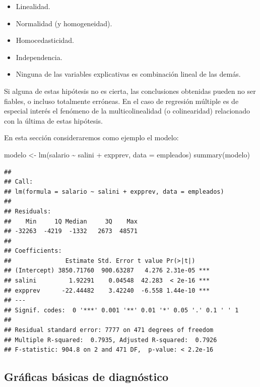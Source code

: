 \documentclass[
]{book}
\newenvironment{Shaded}{\begin{snugshade}}{\end{snugshade}}
\newcommand{\AttributeTok}[1]{\textcolor[rgb]{0.77,0.63,0.00}{#1}}
\newcommand{\FunctionTok}[1]{\textcolor[rgb]{0.00,0.00,0.00}{#1}}
\newcommand{\NormalTok}[1]{#1}
\newcommand{\OtherTok}[1]{\textcolor[rgb]{0.56,0.35,0.01}{#1}}
\newcommand{\SpecialCharTok}[1]{\textcolor[rgb]{0.00,0.00,0.00}{#1}}
\theoremstyle{break}
\theoremstyle{nonumberplain}
\begin{document}
\begin{itemize}
\item
  Linealidad.
\item
  Normalidad (y homogeneidad).
\item
  Homocedasticidad.
\item
  Independencia.
\item
  Ninguna de las variables explicativas es combinación lineal de
  las demás.
\end{itemize}

Si alguna de estas hipótesis no es cierta, las conclusiones obtenidas pueden no ser
fiables, o incluso totalmente erróneas. En el caso de regresión múltiple es
de especial interés el fenómeno de la multicolinealidad (o colinearidad)
relacionado con la última de estas hipótesis.

En esta sección consideraremos como ejemplo el modelo:

\begin{Shaded}
\begin{Highlighting}[]
\NormalTok{modelo }\OtherTok{\textless{}{-}} \FunctionTok{lm}\NormalTok{(salario }\SpecialCharTok{\textasciitilde{}}\NormalTok{ salini }\SpecialCharTok{+}\NormalTok{ expprev, }\AttributeTok{data =}\NormalTok{ empleados)}
\FunctionTok{summary}\NormalTok{(modelo)   }
\end{Highlighting}
\end{Shaded}

\begin{verbatim}
## 
## Call:
## lm(formula = salario ~ salini + expprev, data = empleados)
## 
## Residuals:
##    Min     1Q Median     3Q    Max 
## -32263  -4219  -1332   2673  48571 
## 
## Coefficients:
##               Estimate Std. Error t value Pr(>|t|)    
## (Intercept) 3850.71760  900.63287   4.276 2.31e-05 ***
## salini         1.92291    0.04548  42.283  < 2e-16 ***
## expprev      -22.44482    3.42240  -6.558 1.44e-10 ***
## ---
## Signif. codes:  0 '***' 0.001 '**' 0.01 '*' 0.05 '.' 0.1 ' ' 1
## 
## Residual standard error: 7777 on 471 degrees of freedom
## Multiple R-squared:  0.7935, Adjusted R-squared:  0.7926 
## F-statistic: 904.8 on 2 and 471 DF,  p-value: < 2.2e-16
\end{verbatim}

\hypertarget{gruxe1ficas-buxe1sicas-de-diagnuxf3stico}{%
\subsection{Gráficas básicas de diagnóstico}\label{gruxe1ficas-buxe1sicas-de-diagnuxf3stico}}
\end{document}
